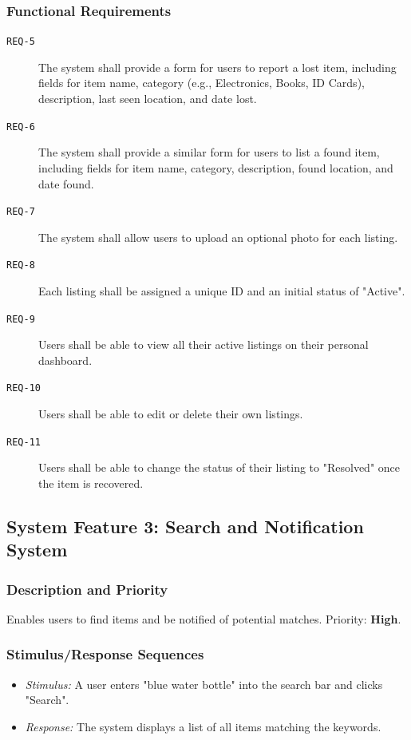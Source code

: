 \documentclass[11pt, a4paper]{article}
\begin{document}
\subsubsection{Functional Requirements}
\begin{description}
    \item[\texttt{REQ-5}] The system shall provide a form for users to report a lost item, including fields for item name, category (e.g., Electronics, Books, ID Cards), description, last seen location, and date lost.
    \item[\texttt{REQ-6}] The system shall provide a similar form for users to list a found item, including fields for item name, category, description, found location, and date found.
    \item[\texttt{REQ-7}] The system shall allow users to upload an optional photo for each listing.
    \item[\texttt{REQ-8}] Each listing shall be assigned a unique ID and an initial status of "Active".
    \item[\texttt{REQ-9}] Users shall be able to view all their active listings on their personal dashboard.
    \item[\texttt{REQ-10}] Users shall be able to edit or delete their own listings.
    \item[\texttt{REQ-11}] Users shall be able to change the status of their listing to "Resolved" once the item is recovered.
\end{description}

\subsection{System Feature 3: Search and Notification System}
\subsubsection{Description and Priority}
Enables users to find items and be notified of potential matches. Priority: \textbf{High}.

\subsubsection{Stimulus/Response Sequences}
\begin{itemize}
    \item \textit{Stimulus:} A user enters "blue water bottle" into the search bar and clicks "Search".
    \item \textit{Response:} The system displays a list of all items matching the keywords.
\end{itemize}
\end{document}
